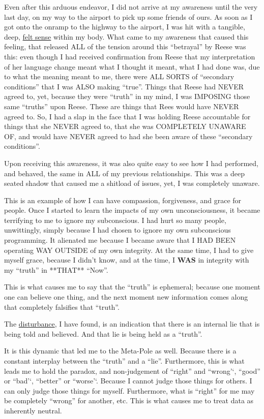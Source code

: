 \documentclass{article}
\begin{document}
Even after this arduous endeavor, I did not arrive at my awareness until the very last day, on my way to the airport to pick up some friends of ours. As soon as I got onto the onramp to the highway to the airport, I was hit with a tangible, deep, \hyperlink{gloss:felt_sense}{felt sense} within my body. What came to my awareness that caused this feeling, that released ALL of the tension around this ``betrayal'' by Reese was this: even though I had received confirmation from Reese that my interpretation of her language change meant what I thought it meant, what I had done was, due to what the meaning meant to me, there were ALL SORTS of ``secondary conditions'' that I was ALSO making ``true''. Things that Reese had NEVER agreed to, yet, because they were ``truth'' in my mind, I was IMPOSING those same ``truths'' upon Reese. These are things that Rees would have NEVER agreed to. So, I had a slap in the face that I was holding Reese accountable for things that she NEVER agreed to, that she was COMPLETELY UNAWARE OF, and would have NEVER agreed to had she been aware of these ``secondary conditions''.

Upon receiving this awareness, it was also quite easy to see how I had performed, and behaved, the same in ALL of my previous relationships. This was a deep seated shadow that caused me a shitload of issues, yet, I was completely unaware.

This is an example of how I can have compassion, forgiveness, and grace for people. Once I started to learn the impacts of my own unconsciousness, it became terrifying to me to ignore my subconscious. I had hurt so many people, unwittingly, simply because I had chosen to ignore my own subconscious programming. It alienated me because I became aware that I HAD BEEN operating WAY OUTSIDE of my own integrity. At the same time, I had to give myself grace, because I didn't know, and at the time, I \textbf{WAS} in integrity with my ``truth'' in **THAT** ``Now''.

This is what causes me to say that the ``truth'' is ephemeral; because one moment one can believe one thing, and the next moment new information comes along that completely falsifies that ``truth''.

The \hyperlink{gloss:disturbance}{disturbance}, I have found, is an indication that there is an internal lie that is being told and believed. And that lie is being held as a ``truth''.

It is this dynamic that led me to the Meta-Pole as well. Because there is a constant interplay between the ``truth'' and a ``lie''. Furthermore, this is what leads me to hold the paradox, and non-judgement of ``right'' and ``wrong'`, ``good'' or ``bad'`, ``better'' or ``worse'`. Because I cannot judge those things for others. I can only judge those things for myself. Furthermore, what is ``right'' for me may be completely ``wrong'' for another, etc. This is what causes me to treat data as inherently neutral.
\end{document}
